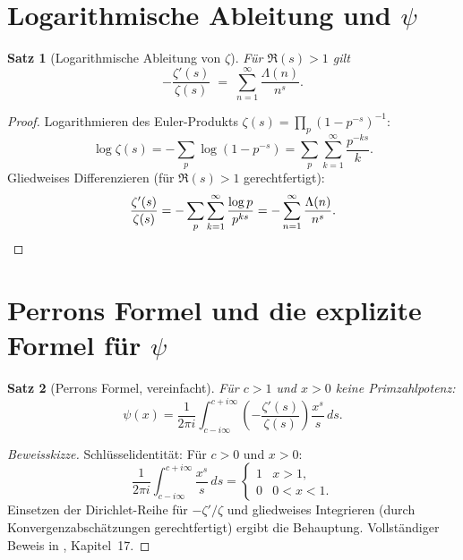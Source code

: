 \documentclass[12pt,a4paper]{amsart}
\newtheorem{theorem}{Satz}[section]
\theoremstyle{definition}
\begin{document}
\section{Logarithmische Ableitung und \texorpdfstring{$\psi$}{psi}}

\begin{theorem}[Logarithmische Ableitung von $\zeta$]
\label{thm:log_deriv}
F\"ur $\Re(s) > 1$ gilt
\[
  -\frac{\zeta'(s)}{\zeta(s)} \;=\; \sum_{n=1}^{\infty} \frac{\Lambda(n)}{n^s}.
\]
\end{theorem}

\begin{proof}
Logarithmieren des Euler-Produkts $\zeta(s) = \prod_p (1-p^{-s})^{-1}$:
\[
  \log\zeta(s) = -\sum_p \log(1 - p^{-s}) = \sum_p \sum_{k=1}^{\infty} \frac{p^{-ks}}{k}.
\]
Gliedweises Differenzieren (f\"ur $\Re(s)>1$ gerechtfertigt):
\[
  \frac{\zeta'(s)}{\zeta(s)} = -\sum_p \sum_{k=1}^{\infty} \frac{\log p}{p^{ks}}
  = -\sum_{n=1}^{\infty} \frac{\Lambda(n)}{n^s}. \qedhere
\]
\end{proof}

\section{Perrons Formel und die explizite Formel f\"ur \texorpdfstring{$\psi$}{psi}}

\begin{theorem}[Perrons Formel, vereinfacht]
\label{thm:perron}
F\"ur $c > 1$ und $x > 0$ keine Primzahlpotenz:
\[
  \psi(x) = \frac{1}{2\pi i} \int_{c-i\infty}^{c+i\infty}
  \left(-\frac{\zeta'(s)}{\zeta(s)}\right) \frac{x^s}{s}\,ds.
\]
\end{theorem}

\begin{proof}[Beweisskizze]
Schl\"usselidentit\"at: F\"ur $c > 0$ und $x > 0$:
\[
  \frac{1}{2\pi i} \int_{c-i\infty}^{c+i\infty} \frac{x^s}{s}\,ds
  = \begin{cases} 1 & x > 1, \\ 0 & 0 < x < 1. \end{cases}
\]
Einsetzen der Dirichlet-Reihe f\"ur $-\zeta'/\zeta$ und gliedweises Integrieren
(durch Konvergenzabsch\"atzungen gerechtfertigt) ergibt die Behauptung.
Vollst\"andiger Beweis in \cite{Davenport2000}, Kapitel~17.
\end{proof}
\end{document}
